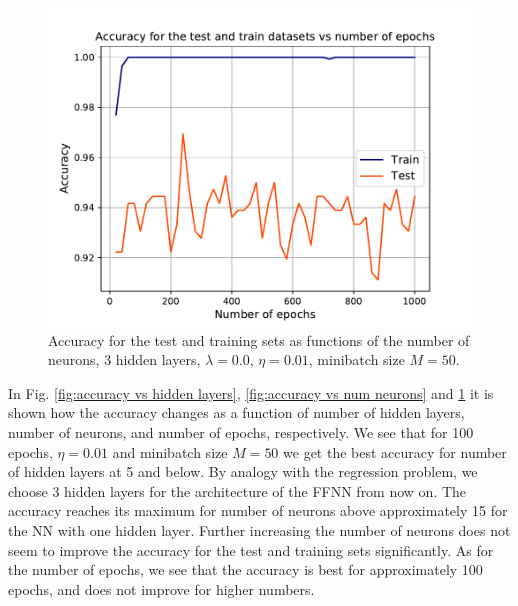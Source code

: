 \documentclass{emulateapj}
\begin{document}
\begin{figure}[h!]
    \centering
    \includegraphics[width=.49\textwidth]{Figures/Class_epochs_number.pdf}
    \caption{Accuracy for the test and training sets as functions of the number of neurons, 3 hidden layers, $\lambda=0.0$, $\eta=0.01$, minibatch size $M=50$.}
    \label{fig:accuracy vs num epochs}
\end{figure}

In Fig. \ref{fig:accuracy vs hidden layers}, \ref{fig:accuracy vs num neurons} and \ref{fig:accuracy vs num epochs} it is shown how the accuracy changes as a function of number of hidden layers, number of neurons, and number of epochs, respectively. We see that for 100 epochs, $\eta=0.01$ and minibatch size $M=50$ we get the best accuracy for number of hidden layers at 5 and below. By analogy with the regression problem, we choose 3 hidden layers for the architecture of the FFNN from now on. The accuracy reaches its maximum for number of neurons above approximately 15 for the NN with one hidden layer. Further increasing the number of neurons does not seem to improve the accuracy for the test and training sets significantly. As for the number of epochs, we see that the accuracy is best for approximately 100 epochs, and does not improve for higher numbers. 
\end{document}
